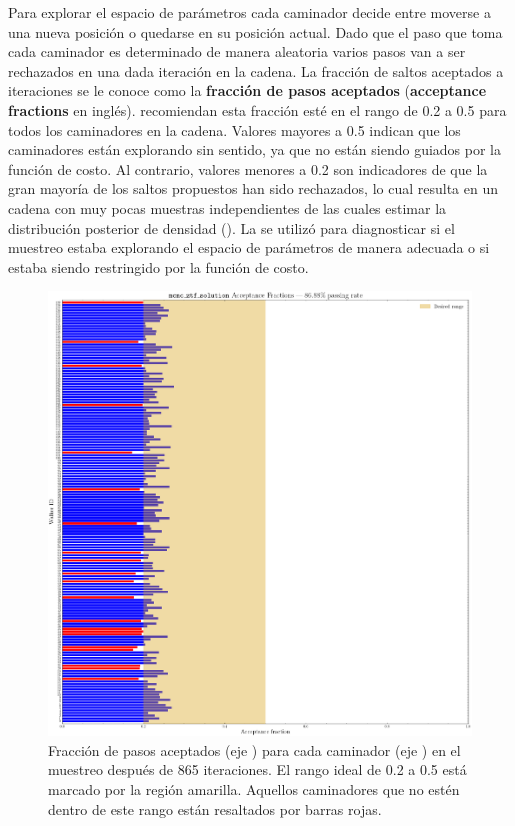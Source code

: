 Para explorar el espacio de parámetros cada caminador decide entre moverse a una
nueva posición o quedarse en su posición actual. Dado que el paso que toma cada
caminador es determinado de manera aleatoria varios pasos van a ser rechazados
en una dada iteración en la cadena. La fracción de saltos aceptados a
iteraciones se le conoce como la \textbf{fracción de pasos aceptados}
(\textbf{acceptance fractions} en inglés).
recomiendan esta fracción esté en el rango de 0.2 a 0.5 para todos los
caminadores en la cadena. Valores mayores a 0.5 indican que los caminadores
están explorando sin sentido, ya que no están siendo guiados por la función de
costo. Al contrario, valores menores a 0.2 son indicadores de que la gran
mayoría de los saltos propuestos han sido rechazados, lo cual resulta en un
cadena con muy pocas muestras independientes de las cuales estimar la
distribución posterior de densidad ().
La  se utilizó para diagnosticar si el
muestreo estaba explorando el espacio de parámetros de manera adecuada o si
estaba siendo restringido por la función de costo.

\begin{figure}[!ht]
	\centering
	\includegraphics[scale=0.36]{Metodologia/Secciones/ModeloComputacional/Figures/Figura MCMC ZTF Acceptance Fractions.png}
	\caption{Fracción de pasos aceptados (eje ) para cada caminador (eje
	) en el muestreo después de 865 iteraciones. El rango ideal de 0.2 a
	0.5 está marcado por la región amarilla. Aquellos caminadores que no estén
	dentro de este rango están resaltados por barras rojas.}
	\label{figuraFraccionPasosAceptados}
\end{figure}

